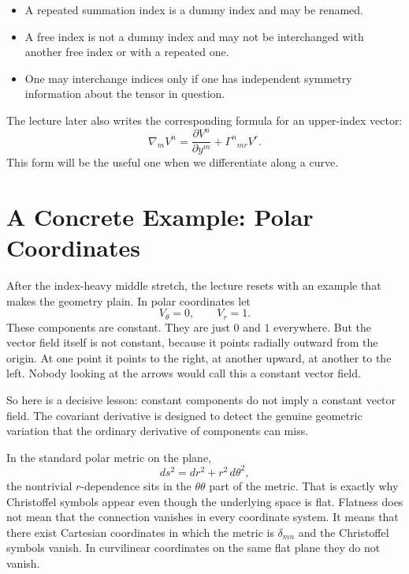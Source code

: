 \begin{itemize}
\item A repeated summation index is a dummy index and may be renamed.
\item A free index is not a dummy index and may not be interchanged with another free index or with a repeated one.
\item One may interchange indices only if one has independent symmetry information about the tensor in question.
\end{itemize}

The lecture later also writes the corresponding formula for an upper-index vector:
\begin{equation}
\nabla_m V^n
=
\frac{\partial V^n}{\partial y^m}
+
\Gamma^n{}_{mr}V^r.
\end{equation}
This form will be the useful one when we differentiate along a curve.

\section{A Concrete Example: Polar Coordinates}

After the index-heavy middle stretch, the lecture resets with an example that makes the geometry plain. In polar coordinates let
\begin{equation}
V_\theta=0,
\qquad
V_r=1.
\end{equation}
These components are constant. They are just \(0\) and \(1\) everywhere. But the vector field itself is not constant, because it points radially outward from the origin. At one point it points to the right, at another upward, at another to the left. Nobody looking at the arrows would call this a constant vector field.

So here is a decisive lesson: constant components do not imply a constant vector field. The covariant derivative is designed to detect the genuine geometric variation that the ordinary derivative of components can miss.

In the standard polar metric on the plane,
\begin{equation}
ds^2=dr^2+r^2\,d\theta^2,
\end{equation}
the nontrivial \(r\)-dependence sits in the \(\theta\theta\) part of the metric. That is exactly why Christoffel symbols appear even though the underlying space is flat. Flatness does not mean that the connection vanishes in every coordinate system. It means that there exist Cartesian coordinates in which the metric is \(\delta_{mn}\) and the Christoffel symbols vanish. In curvilinear coordinates on the same flat plane they do not vanish.

